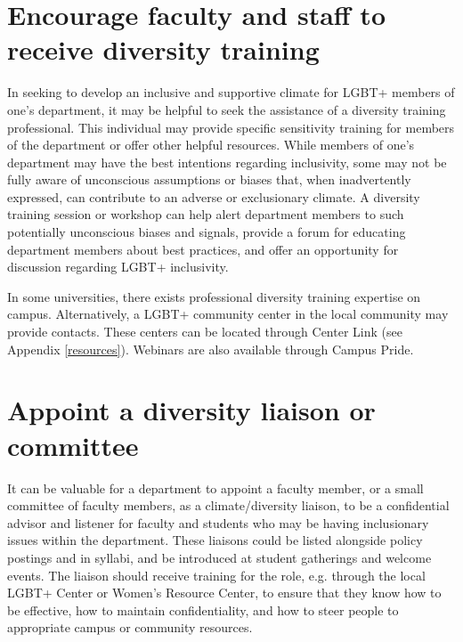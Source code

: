 \section {Encourage faculty and staff to receive diversity training}
\label{diversity-training}
In seeking to develop an inclusive and supportive climate for LGBT+ members of one's department, it may be helpful to seek the assistance of a diversity training professional. This individual may provide specific sensitivity training for members of the department or offer other helpful resources. While members of one's department may have the best intentions regarding inclusivity, some may not be fully aware of unconscious assumptions or biases that, when inadvertently expressed, can contribute to an adverse or exclusionary climate. A diversity training session or workshop can help alert department members to such potentially unconscious biases and signals, provide a forum for educating department members about best practices, and offer an opportunity for discussion regarding LGBT+ inclusivity.

In some universities, there exists professional diversity training expertise on campus. Alternatively, a LGBT+ community center in the local community may provide contacts. These centers can be located through Center Link (see Appendix \ref{resources}). Webinars are also available through Campus Pride.


\section {Appoint a diversity liaison or committee}
\label{liaison}
It can be valuable for a department to appoint a faculty member, or a small committee of faculty members, as a climate/diversity liaison, to be a confidential advisor and listener for faculty and students who may be having inclusionary issues within the department. These liaisons could be listed alongside policy postings and in syllabi, and be introduced at student gatherings and welcome events. The liaison should receive training for the role, e.g. through the local LGBT+ Center or Women's Resource Center, to ensure that they know how to be effective, how to maintain confidentiality, and how to steer people to appropriate campus or community resources. 

